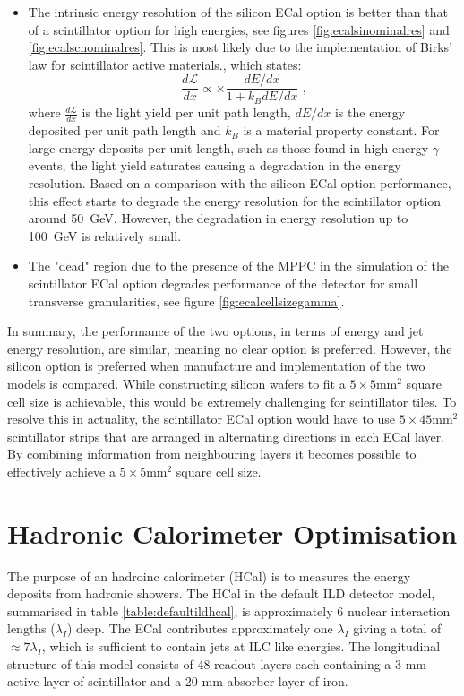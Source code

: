 \begin{itemize}
\item The intrinsic energy resolution of the silicon ECal option is better than that of a scintillator option for high energies, see figures \ref{fig:ecalsinominalres} and \ref{fig:ecalscnominalres}.  This is most likely due to the implementation of Birks' law \cite{BirksLaw} for scintillator active materials., which states:
\begin{equation}
\frac{d\mathcal{L}}{dx} \propto \times \frac{dE/dx}{1+k_{B}dE/dx}\text{ ,}
\end{equation}
where $\frac{d\mathcal{L}}{dx}$ is the light yield per unit path length, $dE/dx$ is the energy deposited per unit path length and $k_{B}$ is a material property constant.  For large energy deposits per unit length, such as those found in high energy $\gamma$ events, the light yield saturates causing a degradation in the energy resolution.  Based on a comparison with the silicon ECal option performance, this effect starts to degrade the energy resolution for the scintillator option around 50~GeV.  However, the degradation in energy resolution up to 100~GeV is relatively small.
\item The "dead" region due to the presence of the MPPC in the simulation of the scintillator ECal option degrades performance of the detector for small transverse granularities, see figure \ref{fig:ecalcellsizegamma}.
\end{itemize}

In summary, the performance of the two options, in terms of energy and jet energy resolution, are similar, meaning no clear option is preferred.  However, the silicon option is preferred when manufacture and implementation of the two models is compared.  While constructing silicon wafers to fit a $5 \times 5 \text{mm}^{2}$ square cell size is achievable, this would be extremely challenging for scintillator tiles.  To resolve this in actuality, the scintillator ECal option would have to use $5 \times 45 \text{mm}^{2}$ scintillator strips that are arranged in alternating directions in each ECal layer.  By combining information from neighbouring layers it becomes possible to effectively achieve a $5 \times 5 \text{mm}^{2}$ square cell size.  


\section{Hadronic Calorimeter Optimisation}
The purpose of an hadroinc calorimeter (HCal) is to measures the energy deposits from hadronic showers.  The HCal in the default ILD detector model, summarised in table \ref{table:defaultildhcal}, is approximately 6 nuclear interaction lengths ($\lambda_{I}$) deep.  The ECal contributes approximately one $\lambda_{I}$ giving a total of $\approx 7 \lambda_{I}$, which is sufficient to contain jets at ILC like energies.  The longitudinal structure of this model consists of 48 readout layers each containing a 3 mm active layer of scintillator and a 20 mm absorber layer of iron.  

